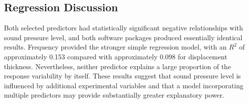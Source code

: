 \subsection{Regression Discussion}

Both selected predictors had statistically significant negative relationships
with sound pressure level, and both software packages produced essentially
identical results. Frequency provided the stronger simple regression model,
with an $R^2$ of approximately 0.153 compared with approximately 0.098 for
displacement thickness. Nevertheless, neither predictor explains a large
proportion of the response variability by itself. These results suggest that
sound pressure level is influenced by additional experimental variables and
that a model incorporating multiple predictors may provide substantially
greater explanatory power.
